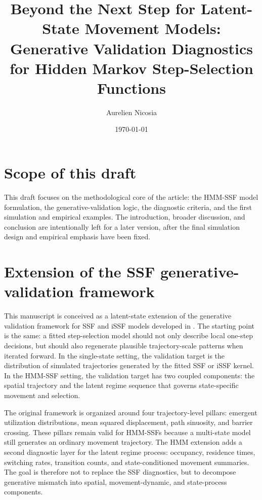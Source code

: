 \documentclass[11pt]{article}
\title{Beyond the Next Step for Latent-State Movement Models: Generative Validation Diagnostics for Hidden Markov Step-Selection Functions}
\author{Aurelien Nicosia}
\date{\today}
\begin{document}
\maketitle


\section*{Scope of this draft}

This draft focuses on the methodological core of the article: the HMM-SSF
model formulation, the generative-validation logic, the diagnostic criteria,
and the first simulation and empirical examples. The introduction, broader
discussion, and conclusion are intentionally left for a later version, after
the final simulation design and empirical emphasis have been fixed.

\section{Extension of the SSF generative-validation framework}

This manuscript is conceived as a latent-state extension of the generative
validation framework for SSF and iSSF models developed in \citet{nicosia2026}.
The starting point is the same: a fitted step-selection model should not only
describe local one-step decisions, but should also regenerate plausible
trajectory-scale patterns when iterated forward. In the single-state setting,
the validation target is the distribution of simulated trajectories generated
by the fitted SSF or iSSF kernel. In the HMM-SSF setting, the validation target
has two coupled components: the spatial trajectory and the latent regime
sequence that governs state-specific movement and selection.

The original framework is organized around four trajectory-level pillars:
emergent utilization distributions, mean squared displacement, path sinuosity,
and barrier crossing. These pillars remain valid for HMM-SSFs because a
multi-state model still generates an ordinary movement trajectory. The HMM
extension adds a second diagnostic layer for the latent regime process:
occupancy, residence times, switching rates, transition counts, and
state-conditioned movement summaries. The goal is therefore not to replace the
SSF diagnostics, but to decompose generative mismatch into spatial,
movement-dynamic, and state-process components.
\end{document}
